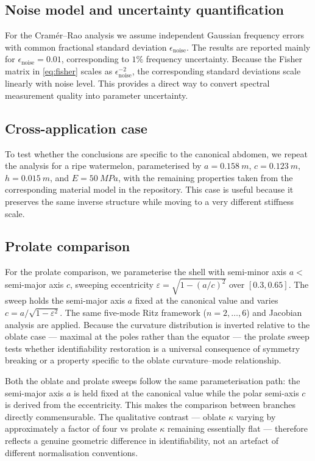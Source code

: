\subsection{Noise model and uncertainty quantification}

For the Cram\'er--Rao analysis we assume independent Gaussian frequency errors
with common fractional standard deviation $\epsilon_\mathrm{noise}$.  The
results are reported mainly for $\epsilon_\mathrm{noise}=0.01$, corresponding to
$1\%$ frequency uncertainty.  Because the Fisher matrix in
\eqref{eq:fisher} scales as $\epsilon_\mathrm{noise}^{-2}$, the corresponding
standard deviations scale linearly with noise level.  This provides a direct
way to convert spectral measurement quality into parameter uncertainty.

\subsection{Cross-application case}

To test whether the conclusions are specific to the canonical abdomen, we repeat
the analysis for a ripe watermelon, parameterised by
$a=\SI{0.158}{m}$, $c=\SI{0.123}{m}$, $h=\SI{0.015}{m}$, and
$E=\SI{50}{MPa}$, with the remaining properties taken from the corresponding
material model in the repository.  This case is useful because it preserves the
same inverse structure while moving to a very different stiffness scale.

\subsection{Prolate comparison}

For the prolate comparison, we parameterise the shell with semi-minor axis
$a < $ semi-major axis $c$, sweeping eccentricity
$\varepsilon = \sqrt{1 - (a/c)^2}$ over $[0.3, 0.65]$.  The sweep holds the
semi-major axis $a$ fixed at the canonical value and varies
$c = a/\sqrt{1-\varepsilon^2}$.  The same five-mode
Ritz framework ($n=2,\ldots,6$) and Jacobian analysis are applied.  Because the
curvature distribution is inverted relative to the oblate case --- maximal at the
poles rather than the equator --- the prolate sweep tests whether identifiability
restoration is a universal consequence of symmetry breaking or a property
specific to the oblate curvature--mode relationship.

Both the oblate and prolate sweeps follow the same parameterisation path: the
semi-major axis $a$ is held fixed at the canonical value while the polar
semi-axis $c$ is derived from the eccentricity.  This makes the comparison
between branches directly commensurable.  The qualitative contrast --- oblate
$\kappa$ varying by approximately a factor of four vs prolate $\kappa$ remaining
essentially flat --- therefore reflects a genuine geometric difference in
identifiability, not an artefact of different normalisation conventions.
